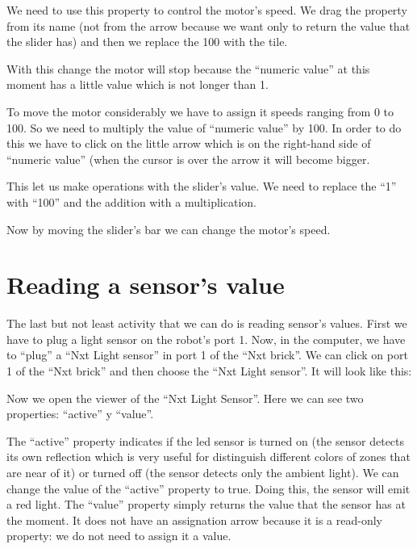 \documentclass[english]{etoys-guide}
\begin{document}

We need to use this property to control the motor’s speed. We drag the property
from its name (not from the arrow because we want only to return the value that
the slider has) and then we replace the 100 with the tile.



With this change the motor will stop because the “numeric value” at this moment
has a little value which is not longer than 1. 

To move the motor considerably we have to assign it speeds ranging from 0 to
100. So we need to multiply the value of “numeric value” by 100. In order to do
this we have to click on the little arrow which is on the right-hand side of
“numeric value” (when the cursor is over the arrow it will become bigger.  






This let us make operations with the slider’s value. We need to replace the “1”
with “100” and the addition with a multiplication.   





Now by moving the slider’s bar we can change the motor’s speed. 

\section{Reading a sensor’s value}

The last but not least activity that we can do is reading sensor’s values.
First we have to plug a light sensor on the robot’s port 1. Now, in the
computer, we have to “plug” a “Nxt Light sensor” in port 1 of the “Nxt brick”.
We can click on port 1 of the “Nxt brick” and then choose the “Nxt Light
sensor”. It will look like this: 




Now we open the viewer of the “Nxt Light Sensor”. Here we can see two
properties: “active” y “value”.



The “active” property indicates if the led sensor is turned on (the sensor
detects its own reflection which is very useful for distinguish different
colors of zones that are near of it) or turned off (the sensor detects only the
ambient light). We can change the value of the “active” property to true. Doing
this, the sensor will emit a red light. The “value” property simply returns the
value that the sensor has at the moment. It does not have an assignation arrow
because it is a read-only property: we do not need to assign it a value. 
\end{document}
